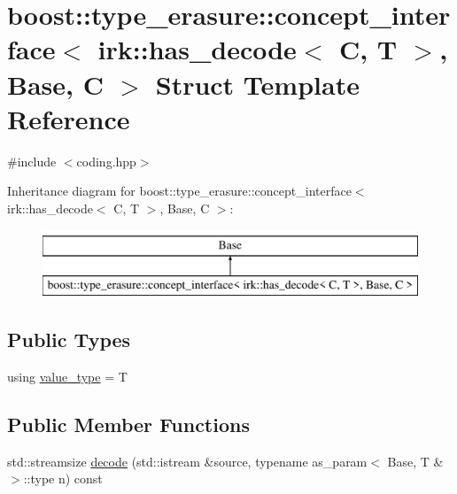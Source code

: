 \hypertarget{structboost_1_1type__erasure_1_1concept__interface_3_01irk_1_1has__decode_3_01C_00_01T_01_4_00_01Base_00_01C_01_4}{}\section{boost\+:\+:type\+\_\+erasure\+:\+:concept\+\_\+interface$<$ irk\+:\+:has\+\_\+decode$<$ C, T $>$, Base, C $>$ Struct Template Reference}
\label{structboost_1_1type__erasure_1_1concept__interface_3_01irk_1_1has__decode_3_01C_00_01T_01_4_00_01Base_00_01C_01_4}


{\ttfamily \#include $<$coding.\+hpp$>$}

Inheritance diagram for boost\+:\+:type\+\_\+erasure\+:\+:concept\+\_\+interface$<$ irk\+:\+:has\+\_\+decode$<$ C, T $>$, Base, C $>$\+:\begin{figure}[H]
\begin{center}
\leavevmode
\includegraphics[height=2.000000cm]{structboost_1_1type__erasure_1_1concept__interface_3_01irk_1_1has__decode_3_01C_00_01T_01_4_00_01Base_00_01C_01_4}
\end{center}
\end{figure}
\subsection*{Public Types}
\begin{DoxyCompactItemize}
\item 
using \mbox{\hyperlink{structboost_1_1type__erasure_1_1concept__interface_3_01irk_1_1has__decode_3_01C_00_01T_01_4_00_01Base_00_01C_01_4_af45858ace775b12c9f2417325f99b268}{value\+\_\+type}} = T
\end{DoxyCompactItemize}
\subsection*{Public Member Functions}
\begin{DoxyCompactItemize}
\item 
std\+::streamsize \mbox{\hyperlink{structboost_1_1type__erasure_1_1concept__interface_3_01irk_1_1has__decode_3_01C_00_01T_01_4_00_01Base_00_01C_01_4_aeba766d79e975ed3869f9dee530e0bc5}{decode}} (std\+::istream \&source, typename as\+\_\+param$<$ Base, T \&$>$\+::type n) const
\end{DoxyCompactItemize}


